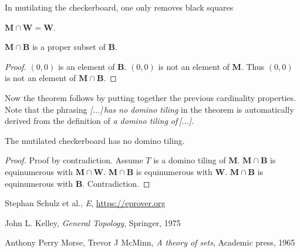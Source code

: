 \documentclass{article}
\newcommand{\Mutilated}{\mathbf{M}}
\newcommand{\Black}{\mathbf{B}}
\newcommand{\White}{\mathbf{W}}
\begin{document}
\noindent In mutilating the checkerboard, one only removes black squares

\begin{forthel}
  \begin{lemma}
      $\Mutilated \cap \White = \White$.
  \end{lemma}

\begin{lemma}
    $\Mutilated\cap\Black$ is a proper subset of $\Black$.
\end{lemma}
\begin{proof}
    $(0,0)$ is an element of $\Black$.
    $(0,0)$ is not an element of $\Mutilated$.
    Thus $(0,0)$ is not an element of $\Mutilated\cap \Black$.
\end{proof}
\end{forthel}

\noindent Now the theorem follows by putting together the previous cardinality properties.
Note that the phrasing \textit{[...]\,has no domino tiling} in the theorem is automatically
derived from the definition of \textit{a domino tiling of\,[...]}.

\begin{forthel}
    \begin{theorem}
        The mutilated checkerboard has no domino tiling.
    \end{theorem}
    \begin{proof}
        Proof by contradiction.
        Assume $T$ is a domino tiling of $\Mutilated$.
        $\Mutilated \cap \Black$ is equinumerous with $\Mutilated \cap \White$.
        $\Mutilated \cap \Black$ is equinumerous with $\White$.
        $\Mutilated \cap \Black$ is equinumerous with $\Black$.
        Contradiction.
    \end{proof}
\end{forthel}

\begin{thebibliography}{1}

 Stephan Schulz et al., \textit{E}, \url{https://eprover.org}

 John L. Kelley, \textit{General Topology}, Springer, 1975

 Anthony Perry Morse, Trevor J McMinn, \textit{A theory of sets}, Academic press, 1965

\end{thebibliography}
\end{document}
